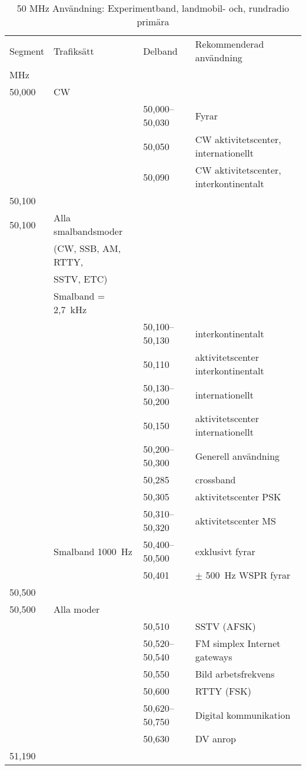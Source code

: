 \begin{table}
\caption{50 MHz Användning: Experimentband, landmobil- och, rundradio primära}
\begin{xtabular}{llll}
Segment & Trafiksätt & Delband & Rekommenderad användning \\
MHz     &            &         & \\ \hline
50,000 & CW &                 & \\
       &    & 50,000--50,030 & Fyrar\\
       &    & 50,050          & CW aktivitetscenter, internationellt\\
       &    & 50,090          & CW aktivitetscenter, interkontinentalt\\
50,100 &    &                 & \\ \hline

50,100 & Alla smalbandsmoder & &\\
       & (CW, SSB, AM, RTTY, & &\\
       & SSTV, ETC)          & &\\
       & Smalband = 2,7~kHz  & &\\
       & & 50,100--50,130 & interkontinentalt\\
       & & 50,110 & aktivitetscenter interkontinentalt\\
       & & 50,130--50,200 & internationellt\\
       & & 50,150 & aktivitetscenter internationellt\\
       & & 50,200--50,300 & Generell användning\\
       & & 50,285 & crossband\\
       & & 50,305 & aktivitetscenter PSK\\
       & & 50,310--50,320 & aktivitetscenter MS\\
       & Smalband 1000~Hz & 50,400--50,500 & exklusivt fyrar\\
       & & 50,401 & \(\pm\) 500~Hz WSPR fyrar\\
50,500 &    &                 & \\ \hline

50,500 & Alla moder & & \\
       & & 50,510 & SSTV (AFSK)\\
       & & 50,520--50,540 & FM simplex Internet gateways\\
       & & 50,550 & Bild arbetsfrekvens\\
       & & 50,600 & RTTY (FSK)\\
       & & 50,620--50,750 & Digital kommunikation\\
       & & 50,630 & DV anrop\\
51,190 &    &   & \\ \hline


\end{xtabular}
\end{table}
